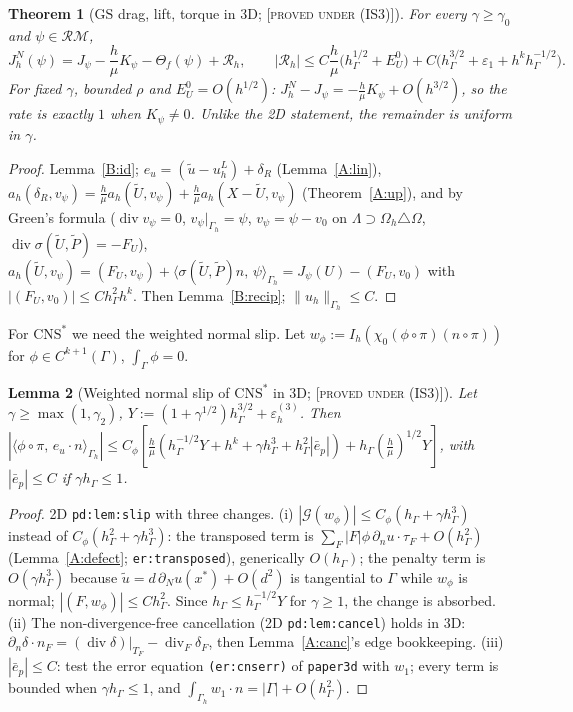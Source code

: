 \documentclass[11pt,reqno]{amsart}
\theoremstyle{plain}
\newtheorem{theorem}{Theorem}[section]
\newtheorem{lemma}[theorem]{Lemma}
\theoremstyle{definition}
\newcommand{\status}[1]{\textup{\textsc{[#1]}}}
\newcommand{\hG}{h_\Gamma}
\newcommand{\Gh}{\Gamma_h}
\newcommand{\Oh}{\Omega_h}
\newcommand{\dn}{\partial_n}
\newcommand{\ut}{\tilde u}
\newcommand{\ip}[2]{\langle #1,\, #2\rangle}
\newcommand{\norm}[1]{\lVert #1\rVert}
\newcommand{\GS}{\mathrm{GS}}
\newcommand{\CNS}{\mathrm{CNS}^\ast}
\newcommand{\epsd}{\varepsilon_h^{(3)}}
\renewcommand{\div}{\operatorname{div}}
\newcommand{\Gc}{\mathcal G}
\newcommand{\Ut}{\tilde U}
\newcommand{\Pt}{\tilde P}
\newcommand{\RM}{\mathcal{RM}}
\begin{document}
\begin{theorem}[$\GS$ drag, lift, torque in 3D; \status{proved under (IS3)}]\label{B:gs}
For every $\gamma\ge\gamma_0$ and $\psi\in\RM$,
\[
J^N_h(\psi)=J_\psi-\frac h\mu K_\psi-\Theta_f(\psi)+\mathcal R_h,\qquad|\mathcal R_h|\le C\frac h\mu\bigl(\hG^{1/2}+E^0_U\bigr)+C\bigl(\hG^{3/2}+\varepsilon_1+h^k\hG^{-1/2}\bigr).
\]
For fixed $\gamma$, bounded $\rho$ and $E^0_U=O(h^{1/2})$: $J^N_h-J_\psi=-\frac h\mu K_\psi+O(h^{3/2})$, so the rate is exactly $1$ when $K_\psi\ne0$. Unlike the 2D statement, the remainder is uniform in $\gamma$.
\end{theorem}
\begin{proof}
Lemma~\ref{B:id}; $e_u=(\ut-u^L_h)+\delta_R$ (Lemma~\ref{A:lin}), $a_h(\delta_R,v_\psi)=\frac h\mu a_h(\Ut,v_\psi)+\frac h\mu a_h(X-\Ut,v_\psi)$ (Theorem~\ref{A:up}), and by Green's formula ($\div v_\psi=0$, $v_\psi|_{\Gh}=\psi$, $v_\psi=\psi-v_0$ on $\Lambda\supset\Oh\triangle\Omega$, $\div\sigma(\Ut,\Pt)=-F_U$), $a_h(\Ut,v_\psi)=(F_U,v_\psi)+\ip{\sigma(\Ut,\Pt)n}{\psi}_{\Gh}=J_\psi(U)-(F_U,v_0)$ with $|(F_U,v_0)|\le C\hG^2h^k$. Then Lemma~\ref{B:recip}; $\norm{u_h}_{\Gh}\le C$.
\end{proof}

For $\CNS$ we need the weighted normal slip. Let $w_\phi:=I_h(\chi_0(\phi\circ\pi)(n\circ\pi))$ for $\phi\in C^{k+1}(\Gamma)$, $\int_\Gamma\phi=0$.
\begin{lemma}[Weighted normal slip of $\CNS$ in 3D; \status{proved under (IS3)}]\label{B:slip}
Let $\gamma\ge\max(1,\gamma_2)$, $Y:=(1+\gamma^{1/2})\hG^{3/2}+\epsd$. Then $|\ip{\phi\circ\pi}{e_u\cdot n}_{\Gh}|\le C_\phi[\frac h\mu(\hG^{-1/2}Y+h^k+\gamma\hG^3+\hG^2|\bar e_p|)+\hG(\frac h\mu)^{1/2}Y]$, with $|\bar e_p|\le C$ if $\gamma\hG\le1$.
\end{lemma}
\begin{proof}
2D \texttt{pd:lem:slip} with three changes. (i) $|\Gc(w_\phi)|\le C_\phi(\hG+\gamma\hG^3)$ instead of $C_\phi(\hG^2+\gamma\hG^3)$: the transposed term is $\sum_F|F|\phi\,\dn u\cdot\tau_F+O(\hG^2)$ (Lemma~\ref{A:defect}; \texttt{er:transposed}), generically $O(\hG)$; the penalty term is $O(\gamma\hG^3)$ because $\ut=d\,\partial_Nu(x^\ast)+O(d^2)$ is tangential to $\Gamma$ while $w_\phi$ is normal; $|(F,w_\phi)|\le C\hG^2$. Since $\hG\le\hG^{-1/2}Y$ for $\gamma\ge1$, the change is absorbed. (ii) The non-divergence-free cancellation (2D \texttt{pd:lem:cancel}) holds in 3D: $\dn\delta\cdot n_F=(\div\delta)|_{T_F}-\div_F\delta_F$, then Lemma~\ref{A:canc}'s edge bookkeeping. (iii) $|\bar e_p|\le C$: test the error equation \texttt{(er:cnserr)} of \texttt{paper3d} with $w_1$; every term is bounded when $\gamma\hG\le1$, and $\int_{\Gh}w_1\cdot n=|\Gamma|+O(\hG^2)$.
\end{proof}
\end{document}
